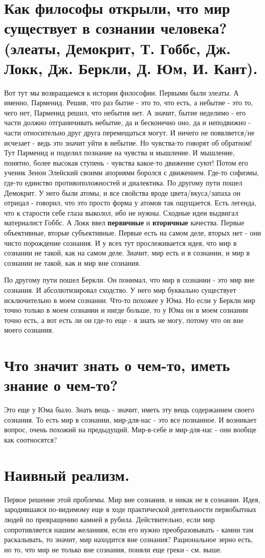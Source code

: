 \section{ Как философы открыли, что мир существует в сознании человека? (элеаты, Демокрит, Т. Гоббс, Дж. Локк, Дж. Беркли, Д. Юм, И. Кант).}
Вот тут мы возвращаемся к истории философии. Первыми были элеаты. А именно, Парменид. Решив, что раз бытие - это то, что есть, а небытие - это то, чего нет, Парменид решил, что небытия нет. А значит, бытие неделимо - его части должно отграничивать небытие, да и бесконечно оно, да и неподвижно - части относительно друг друга перемещаться могут. И ничего не появляется/не исчезает - ведь это значит уйти в небытие. Но чувства-то говорят об обратном! Тут Парменид и поделил познание на чувства и мышление. И мышление, понятно, более высокая ступень - чувства какое-то движение суют! Потом его ученик Зенон Элейский своими апориями боролся с движением. Где-то софизмы, где-то единство противоположностей и диалектика. По другому пути пошел Демокрит. У него были атомы, и все свойства вроде цвета/вкуса/запаха он отрицал - говорил, что это просто форма у атомов так ощущается. Есть легенда, что к старости себе глаза выколол, ибо не нужны. Сходные идеи выдвигал материалист Гоббс. А Локк ввел \textbf{первичные} и \textbf{вторичные} качества. Первые объективные, вторые субъективные. Первые есть на самом деле, вторых нет - они чисто порождение сознания. И у всех тут прослеживается идея, что мир в сознании не такой, как на самом деле. Значит, мир есть и в сознании, и мир в сознании не такой, как и мир вне сознания. 

По другому пути пошел Беркли. Он понимал, что мир в сознании - это мир вне сознания. И абсолютизировал сходство. У него мир буквально существует исключительно в моем сознании. Что-то похожее у Юма. Но если у Беркли мир точно только в моем сознании и нигде больше, то у Юма он в моем сознании точно есть, а вот есть ли он где-то еще - я знать не могу, потому что он вне моего сознания.

\section{ Что значит знать о чем-то, иметь знание о чем-то?}
Это еще у Юма было. Знать вещь - значит, иметь эту вещь содержанием своего сознания. То есть мир в сознании, мир-для-нас - это все познанное. И возникает вопрос, очень похожий на предыдущий. Мир-в-себе и мир-для-нас - они вообще как соотносятся?

\section{ Наивный реализм.}
Первое решение этой проблемы. Мир вне сознания, и никак не в сознании. Идея, зародившаяся по-видимому еще в ходе практической деятельности первобытных людей по превращению камней в рубила. Действительно, если мир сопротивляется нашим желаниям, если его нужно преобразовывать - камни там раскалывать, то значит, мир находится вне сознания? Рациональное зерно есть, но то, что мир не только вне сознания, поняли еще греки - см. выше.

